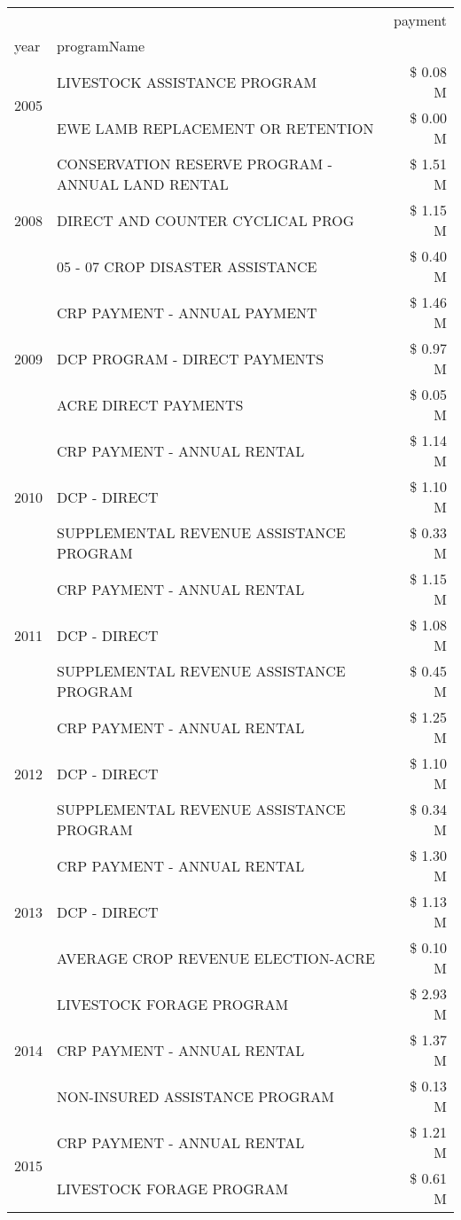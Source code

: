 \begin{tabular}{llr}
\toprule
 &  & payment \\
year & programName &  \\
\midrule
\multirow[t]{2}{*}{2005} & LIVESTOCK ASSISTANCE PROGRAM & \$ 0.08 M \\
 & EWE LAMB REPLACEMENT OR RETENTION & \$ 0.00 M \\
\cline{1-3}
\multirow[t]{3}{*}{2008} & CONSERVATION RESERVE PROGRAM - ANNUAL LAND RENTAL & \$ 1.51 M \\
 & DIRECT AND COUNTER CYCLICAL PROG & \$ 1.15 M \\
 & 05 - 07 CROP DISASTER ASSISTANCE & \$ 0.40 M \\
\cline{1-3}
\multirow[t]{3}{*}{2009} & CRP PAYMENT - ANNUAL PAYMENT & \$ 1.46 M \\
 & DCP PROGRAM - DIRECT PAYMENTS & \$ 0.97 M \\
 & ACRE DIRECT PAYMENTS & \$ 0.05 M \\
\cline{1-3}
\multirow[t]{3}{*}{2010} & CRP PAYMENT - ANNUAL RENTAL & \$ 1.14 M \\
 & DCP - DIRECT & \$ 1.10 M \\
 & SUPPLEMENTAL REVENUE ASSISTANCE PROGRAM & \$ 0.33 M \\
\cline{1-3}
\multirow[t]{3}{*}{2011} & CRP PAYMENT - ANNUAL RENTAL & \$ 1.15 M \\
 & DCP - DIRECT & \$ 1.08 M \\
 & SUPPLEMENTAL REVENUE ASSISTANCE PROGRAM & \$ 0.45 M \\
\cline{1-3}
\multirow[t]{3}{*}{2012} & CRP PAYMENT - ANNUAL RENTAL & \$ 1.25 M \\
 & DCP - DIRECT & \$ 1.10 M \\
 & SUPPLEMENTAL REVENUE ASSISTANCE PROGRAM & \$ 0.34 M \\
\cline{1-3}
\multirow[t]{3}{*}{2013} & CRP PAYMENT - ANNUAL RENTAL & \$ 1.30 M \\
 & DCP - DIRECT & \$ 1.13 M \\
 & AVERAGE CROP REVENUE ELECTION-ACRE & \$ 0.10 M \\
\cline{1-3}
\multirow[t]{3}{*}{2014} & LIVESTOCK FORAGE PROGRAM & \$ 2.93 M \\
 & CRP PAYMENT - ANNUAL RENTAL & \$ 1.37 M \\
 & NON-INSURED ASSISTANCE PROGRAM & \$ 0.13 M \\
\cline{1-3}
\multirow[t]{3}{*}{2015} & CRP PAYMENT - ANNUAL RENTAL & \$ 1.21 M \\
 & LIVESTOCK FORAGE PROGRAM & \$ 0.61 M \\

\end{tabular}

